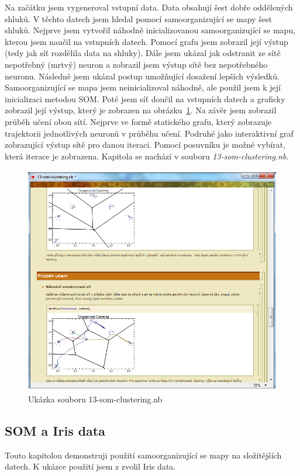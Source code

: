 \documentclass[11pt,twoside,a4paper]{book}
\begin{document}
Na začátku jsem vygeneroval vstupní data. Data obsahují šest dobře oddělených shluků. V těchto datech jsem hledal pomocí samoorganizující se mapy šest shluků. Nejprve jsem vytvořil náhodně inicializovanou samoorganizující se mapu, kterou jsem naučil na vstupních datech. Pomocí grafu jsem zobrazil její výstup (tedy jak síť rozdělila data na shluky). Dále jsem ukázal jak odstranit ze sítě nepotřebný (mrtvý) neuron a zobrazil jsem výstup sítě bez nepotřebného neuronu. Následně jsem ukázal postup umožňující dosažení lepších výsledků. Samoorganizující se mapa jsem neinicializoval náhodně, ale použil jsem k její inicializaci metodou SOM. Poté jsem síť doučil na vstupních datech a graficky zobrazil její výstup, který je zobrazen na obrázku~\ref{fig:som-clustering}. Na závěr jsem zobrazil průběh učení obou sítí. Nejprve ve formě statického grafu, který zobrazuje trajektorii jednotlivých neuronů v průběhu učení. Podruhé jako interaktivní graf zobrazující výstup sítě pro danou iteraci. Pomocí posuvníku je možné vybírat, která iterace je zobrazena. Kapitola se nachází v souboru \textit{13-som-clustering.nb}.

\begin{figure}[h!]
\begin{center}
\includegraphics[height=10cm]{figures/ukazka13.png}
\caption{Ukázka souboru 13-som-clustering.nb}
\label{fig:som-clustering}
\end{center}
\end{figure}

\subsection{SOM a Iris data}
Touto kapitolou demonstruji použití samoorganizující se mapy na složitějších datech. K ukázce použití jsem z zvolil Iris data.
\end{document}
